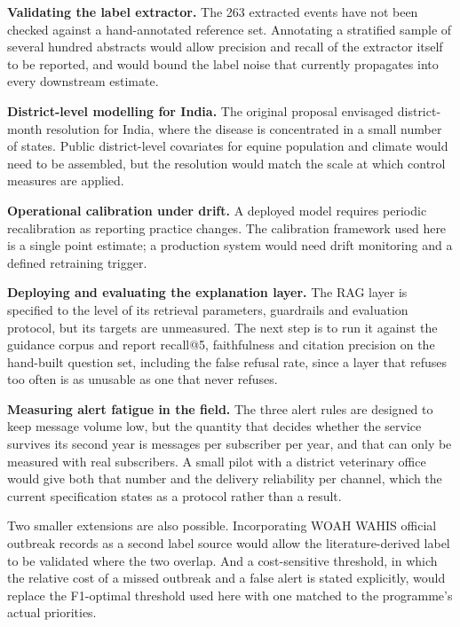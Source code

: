 \documentclass[10pt,openany]{report}
\begin{document}
\textbf{Validating the label extractor.} The 263 extracted events have not been checked against a
hand-annotated reference set. Annotating a stratified sample of several hundred abstracts would
allow precision and recall of the extractor itself to be reported, and would bound the label noise
that currently propagates into every downstream estimate.

\textbf{District-level modelling for India.} The original proposal envisaged district-month
resolution for India, where the disease is concentrated in a small number of states. Public
district-level covariates for equine population and climate would need to be assembled, but the
resolution would match the scale at which control measures are applied.

\textbf{Operational calibration under drift.} A deployed model requires periodic recalibration as
reporting practice changes. The calibration framework used here is a single point estimate; a
production system would need drift monitoring and a defined retraining trigger.

\textbf{Deploying and evaluating the explanation layer.} The RAG layer is specified to the level of
its retrieval parameters, guardrails and evaluation protocol, but its targets are unmeasured. The
next step is to run it against the guidance corpus and report recall@5, faithfulness and citation
precision on the hand-built question set, including the false refusal rate, since a layer that
refuses too often is as unusable as one that never refuses.

\textbf{Measuring alert fatigue in the field.} The three alert rules are designed to keep message
volume low, but the quantity that decides whether the service survives its second year is messages
per subscriber per year, and that can only be measured with real subscribers. A small pilot with a
district veterinary office would give both that number and the delivery reliability per channel,
which the current specification states as a protocol rather than a result.

Two smaller extensions are also possible. Incorporating WOAH WAHIS official outbreak records \cite{wahis} as a
second label source would allow the literature-derived label to be validated where the two
overlap. And a cost-sensitive threshold, in which the relative cost of a missed outbreak and a
false alert is stated explicitly, would replace the F1-optimal threshold used here with one
matched to the programme's actual priorities.

\newpage
\end{document}
